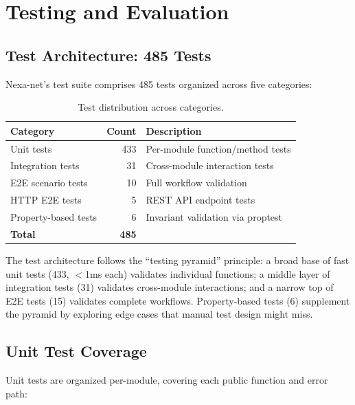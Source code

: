 \section{Testing and Evaluation}

\subsection{Test Architecture: 485 Tests}

Nexa-net's test suite comprises 485 tests organized across five categories:

\begin{table}[h]
\centering
\begin{tabular}{@{}lrl@{}}
\toprule
Category & Count & Description \\
\midrule
Unit tests & 433 & Per-module function/method tests \\
Integration tests & 31 & Cross-module interaction tests \\
E2E scenario tests & 10 & Full workflow validation \\
HTTP E2E tests & 5 & REST API endpoint tests \\
Property-based tests & 6 & Invariant validation via proptest \\
\midrule
\textbf{Total} & \textbf{485} & \\
\bottomrule
\end{tabular}
\caption{Test distribution across categories.}
\label{tab:test-distribution}
\end{table}

The test architecture follows the ``testing pyramid'' principle: a broad base of fast unit tests (433, $<$1ms each) validates individual functions; a middle layer of integration tests (31) validates cross-module interactions; and a narrow top of E2E tests (15) validates complete workflows. Property-based tests (6) supplement the pyramid by exploring edge cases that manual test design might miss.

\subsection{Unit Test Coverage}

Unit tests are organized per-module, covering each public function and error path:

